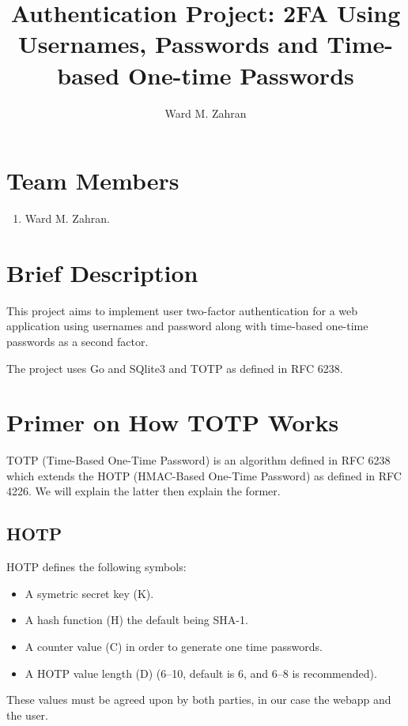 \documentclass[a4paper]{article}
\title{Authentication Project: 2FA Using Usernames, Passwords and Time-based One-time Passwords}
\author{Ward M. Zahran}
\begin{document}
\maketitle
\pagebreak

\tableofcontents
\pagebreak

\section{Team Members}
\begin{enumerate}
    \item Ward M. Zahran.
\end{enumerate}

\section{Brief Description}
This project aims to implement user two-factor authentication for a web application using usernames and password along with time-based one-time passwords as a second factor. 

The project uses Go and SQlite3 and TOTP as defined in RFC 6238.

\section{Primer on How TOTP Works}
TOTP (Time-Based One-Time Password) is an algorithm defined in RFC 6238 which extends the HOTP (HMAC-Based One-Time Password) as defined in RFC 4226. We will explain the latter then explain the former.

\subsection{HOTP}

HOTP defines the following symbols:
\begin{itemize}
    \item 
        A symetric secret key (K).
    \item 
        A hash function (H) the default being SHA-1.
    \item 
        A counter value (C) in order to generate one time passwords.
    \item 
        A HOTP value length (D) (6–10, default is 6, and 6–8 is recommended).
\end{itemize}

These values must be agreed upon by both parties, in our case the webapp and the user. 
\end{document}
